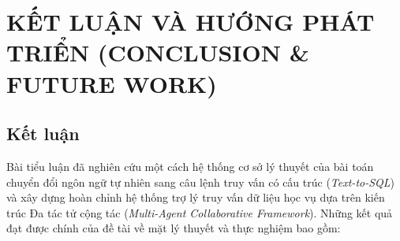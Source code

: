 \documentclass[12pt,a4paper]{report}
\begin{document}
\chapter{KẾT LUẬN VÀ HƯỚNG PHÁT TRIỂN (CONCLUSION \& FUTURE WORK)}

\section{Kết luận}

Bài tiểu luận đã nghiên cứu một cách hệ thống cơ sở lý thuyết của bài toán chuyển đổi ngôn ngữ tự nhiên sang câu lệnh truy vấn có cấu trúc (\textit{Text-to-SQL}) và xây dựng hoàn chỉnh hệ thống trợ lý truy vấn dữ liệu học vụ dựa trên kiến trúc Đa tác tử cộng tác (\textit{Multi-Agent Collaborative Framework}). Những kết quả đạt được chính của đề tài về mặt lý thuyết và thực nghiệm bao gồm:
\end{document}
